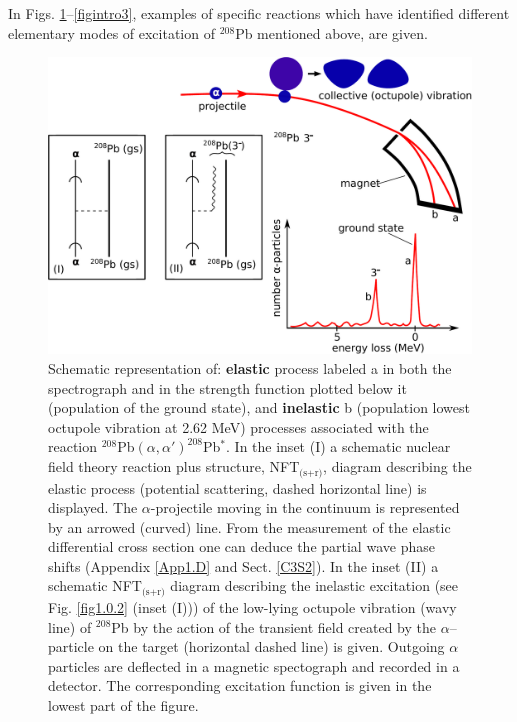 In Figs. \ref{figintro1}--\ref{figintro3}, examples of specific reactions which have identified different elementary modes of excitation of $^{208}$Pb mentioned above, are given.
\begin{figure}
\centerline {
\includegraphics*[width=15cm]{introduccion/figs/figintro1}
}
\caption{Schematic representation of:  \textbf{elastic} process labeled a in both the spectrograph and in the strength function plotted below it (population of the ground state), and \textbf{inelastic} b (population lowest octupole vibration at 2.62 MeV) processes associated with the reaction $^{208}$Pb$(\alpha,\alpha')^{208}$Pb$^*$.  In the inset (I) a schematic nuclear field theory reaction plus structure, NFT$_{\text{(s+r)}}$,  diagram describing  the elastic process (potential scattering, dashed horizontal line) is displayed. The $\alpha$-projectile moving in the continuum is represented by an arrowed (curved) line. From the measurement of the elastic differential cross section one can deduce the partial wave phase shifts (Appendix \ref{App1.D} and Sect. \ref{C3S2}). In the inset (II) a schematic NFT$_{\text{(s+r)}}$ diagram describing the inelastic  excitation (see Fig.  \ref{fig1.0.2} (inset (I))) of the low-lying octupole vibration (wavy line) of $^{208}$Pb by the action of the transient field created by the $\alpha$--particle on the target (horizontal dashed line) is given.  Outgoing $\alpha$ particles are deflected in a magnetic spectograph and recorded in a detector. The corresponding excitation function is given in the lowest part of the figure.}
\label{figintro1}
\end{figure}
